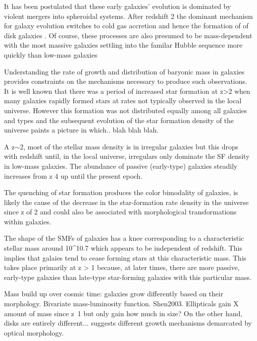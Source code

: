 It has been postulated that these early galaxies' evolution is dominated by violent mergers into spheroidal systems\citep{Driver2013,Bluck2009,Man2012}. After redshift 2 the dominant mechanism for galaxy evolution switches to cold gas accretion and hence the formation of of disk galaxies \citep{Conselice2013}. Of course, these processes are also presumed to be mass-dependent with the most massive galaxies settling into the familar Hubble sequence more quickly than low-mass galaxies \citep{Buitrago2013,Conselice2011,Mortlock2013}

Understanding the rate of growth and distribution of baryonic mass in galaxies provides constraints on the mechanisms necessary to produce such observations. It is well known that there was a period of increased star formation at z>2 when many galaxies rapidly formed stars at rates not typically observed in the local universe. However this formation was not distributed equally among all galaxies and types and the subsequent evolution of the star formation density of the universe paints a picture in which.. blah blah blah. 

A z$\sim$2, most of the stellar mass density is in irregular galaxies \citep{HuertasCompany2016} but this drops with redshift until, in the local universe, irregulars only dominate the SF density in low-mass galaxies. The abundance of passive (early-type) galaxies steadily increases from z 4 up until the present epoch. 

The quenching of star formation produces the color bimodality of galaxies, is likely the cause of the decrease in the star-formation rate density in the universe since z of 2 and could also be associated with morphological transformations within galaxies. 

The shape of the SMFs of galaxies has a knee corresponding to a characteristic stellar mass around 10^10.7 which appears to be independent of redshift. This implies that galaies tend to cease forming stars at this characteristic mass. This takes place primarily at z > 1 because, at later times, there are more passive, early-type galaxies than late-type star-forming galaxies with this particular mass. 


Mass build up over cosmic time: galaxies grow differently based on their morphology. Bivariate mass-luminosity function. Shen2003. Ellipticals gain X amount of mass since z~1 but only gain how much in size? On the other hand, disks are entirely different... suggests different growth mechanisms demarcated by optical morphology. 

